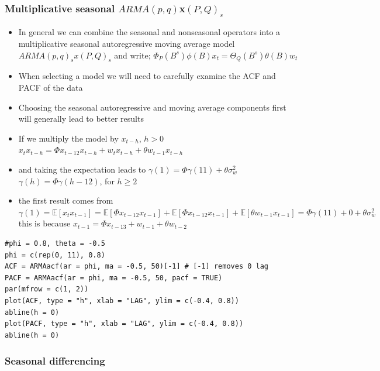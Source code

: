 \documentclass{article}
\begin{document}
\subsubsection{Multiplicative seasonal $ARMA(p,q) $x$ (P,Q)_s$}

\begin{itemize}
    \item In general we can combine the seasonal and nonseasonal operators into a multiplicative seasonal autoregressive moving average model $ARMA(p,q)_s x (P,Q)_s$ and write;
    \subitem $\Phi_P (B^s) \phi(B) x_t = \Theta_Q (B^s) \theta (B) w_t$
    \item When selecting a model we will need to carefully examine the ACF and PACF of the data
    \item Choosing the seasonal autoregressive and moving average components first will generally lead to better results
\end{itemize}

\begin{itemize}
    \item If we multiply the model by $x_{t-h}$, $h>0$
    \subitem $x_t x_{t-h} = \Phi x_{t-12} x_{t-h} + w_t x_{t-h} + \theta w_{t-1} x_{t-h}$  
    \item and taking the expectation leads to 
    \subitem $\gamma(1) = \Phi \gamma(11) + \theta \sigma^2 _w$
    \subitem $\gamma(h) = \Phi \gamma(h - 12)$, for $h \geq 2$
    \item the first result comes from 
    \subitem $\gamma(1) = \mathbb{E}[x_t x_{t-1}] = \mathbb{E}[\Phi x_{t-12} x_{t-1}] + \mathbb{E}[\Phi x_{t-12} x_{t-1}] + \mathbb{E}[\theta w_{t-1} x_{t-1}] = \Phi \gamma(11) + 0 + \theta\sigma^2_w$ 
    \subitem this is because $x_{t-1} = \Phi x_{t-13} + w_{t-1} + \theta w_{t-2}$
\end{itemize}

\begin{lstlisting}
#phi = 0.8, theta = -0.5
phi = c(rep(0, 11), 0.8)
ACF = ARMAacf(ar = phi, ma = -0.5, 50)[-1] # [-1] removes 0 lag
PACF = ARMAacf(ar = phi, ma = -0.5, 50, pacf = TRUE)
par(mfrow = c(1, 2))
plot(ACF, type = "h", xlab = "LAG", ylim = c(-0.4, 0.8))
abline(h = 0)
plot(PACF, type = "h", xlab = "LAG", ylim = c(-0.4, 0.8))
abline(h = 0)
\end{lstlisting}




\subsubsection{Seasonal differencing}
\end{document}
